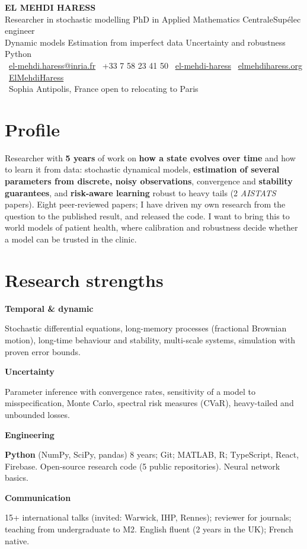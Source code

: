 \documentclass[10pt,a4paper]{article}
\newlength{\datecol}\setlength{\datecol}{0.155\textwidth}
\newlength{\gutter}\setlength{\gutter}{0.85em}
\newlength{\bodycol}
\newcommand{\skillrow}[2]{%
  \par\noindent
  \begin{minipage}[t]{\datecol}
    \vspace{0pt}\raggedright{\headingfont\bfseries\footnotesize #1}
  \end{minipage}%
  \hspace{\gutter}%
  \begin{minipage}[t]{\bodycol}
    \vspace{0pt}\raggedright\footnotesize #2
  \end{minipage}%
  \par\vspace{0.35ex}
}
\begin{document}
{\headingfont\bfseries\fontsize{20}{23}\selectfont EL MEHDI HARESS}\\[0.55ex]
{\headingfont\fontsize{10}{12}\selectfont\color{accent}%
Researcher in stochastic modelling \textbar{} PhD in Applied Mathematics \textbar{} CentraleSupélec engineer}\\[0.22ex]
{\small\color{muted}Dynamic models \textbar{} Estimation from imperfect data \textbar{} Uncertainty and robustness \textbar{} Python}\\[0.95ex]
{\footnotesize
\faEnvelope[regular]~\href{mailto:el-mehdi.haress@inria.fr}{el-mehdi.haress@inria.fr}\quad
\faPhone*~+33 7 58 23 41 50\quad
\faLinkedin~\href{https://www.linkedin.com/in/el-mehdi-haress-67750b3aa/}{el-mehdi-haress}\quad
\faGlobe~\href{https://elmehdiharess.org}{elmehdiharess.org}\quad
\faGithub~\href{https://github.com/ElMehdiHaress}{ElMehdiHaress}\\[0.22ex]
\faMapMarker*~Sophia Antipolis, France \textemdash{} open to relocating to Paris}

\vspace{0.65ex}

\section{Profile}
\footnotesize
Researcher with \textbf{5 years} of work on \textbf{how a state evolves over time} and how to learn it from
data: stochastic dynamical models, \textbf{estimation of several parameters from discrete, noisy
observations}, convergence and \textbf{stability guarantees}, and \textbf{risk-aware learning} robust to
heavy tails (2 \emph{AISTATS} papers). Eight peer-reviewed papers; I have driven my own research from the
question to the published result, and released the code. I want to bring this to world models of patient
health, where calibration and robustness decide whether a model can be trusted in the clinic.
\normalsize

\section{Research strengths}
\skillrow{Temporal \& dynamic}{Stochastic differential equations, long-memory processes (fractional Brownian
motion), long-time behaviour and stability, multi-scale systems, simulation with proven error bounds.}
\skillrow{Uncertainty}{Parameter inference with convergence rates, sensitivity of a model to
misspecification, Monte Carlo, spectral risk measures (CVaR), heavy-tailed and unbounded losses.}
\skillrow{Engineering}{\textbf{Python} (NumPy, SciPy, pandas) \textemdash{} 8 years; Git; MATLAB, R;
TypeScript, React, Firebase. Open-source research code (5 public repositories). Neural network basics.}
\skillrow{Communication}{15+ international talks (invited: Warwick, IHP, Rennes); reviewer for journals;
teaching from undergraduate to M2. English \textemdash{} fluent (2 years in the UK); French \textemdash{} native.}
\end{document}
